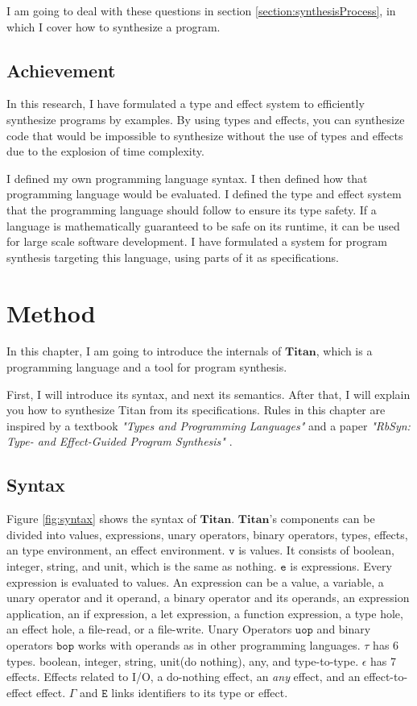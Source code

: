 \documentclass[12pt, a4paper, titlepage]{report}
\begin{document}
    I am going to deal with these questions in section \ref{section:synthesisProcess}, in which I cover how to synthesize a program.

  \section{Achievement} %
  In this research, I have formulated a type and effect system to efficiently synthesize programs by examples.
  By using types and effects, you can synthesize code that would be impossible to synthesize without the use of types and effects due to the explosion of time complexity.

  I defined my own programming language syntax.
  I then defined how that programming language would be evaluated.
  I defined the type and effect system that the programming language should follow to ensure its type safety.
  If a language is mathematically guaranteed to be safe on its runtime, it can be used for large scale software development.
  I have formulated a system for program synthesis targeting this language, using parts of it as specifications.

\chapter{Method}\label{chapter:method}
  In this chapter, I am going to introduce the internals of $\mathbf{Titan}$, which is a programming language and a tool for program synthesis.

  First, I will introduce its syntax, and next its semantics.
  After that, I will explain you how to synthesize Titan from its specifications.
  Rules in this chapter are inspired by a textbook \emph{"Types and Programming Languages"} \cite{pierce:2002} and a paper \emph{"RbSyn: Type- and Effect-Guided Program Synthesis"} \cite{guria:2021}.
  \section{Syntax}\label{section:syntax}
    Figure \ref{fig:syntax} shows the syntax of $\mathbf{Titan}$.
    $\mathbf{Titan}$'s components can be divided into values, expressions, unary operators, binary operators, types, effects, an type environment, an effect environment.
    $\mathtt{v}$ is values. It consists of boolean, integer, string, and unit, which is the same as nothing.
    $\mathtt{e}$ is expressions. Every expression is evaluated to values.
    An expression can be a value, a variable, a unary operator and it operand, a binary operator and its operands, an expression application, an if expression, a let expression, a function expression, a type hole, an effect hole, a file-read, or a file-write.
    Unary Operators $\mathtt{uop}$ and binary operators $\mathtt{bop}$ works with operands as in other programming languages.
    $\mathtt{\tau}$ has 6 types. boolean, integer, string, unit(do nothing), any, and type-to-type.
    $\mathtt{\epsilon}$ has 7 effects. Effects related to I/O, a do-nothing effect, an \textit{any} effect, and an effect-to-effect effect.
    $\mathtt{\Gamma}$ and $\mathtt{E}$ links identifiers to its type or effect.
\end{document}

